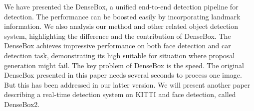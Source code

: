 We have presented the DenseBox, a unified end-to-end detection pipeline for detection. The performance can be boosted easily by incorporating landmark information. We also analysis our method and other related object detection system, highlighting the difference and the contribution of DenseBox.  The DenseBox achieves impressive performance on both face detection and car detection task, demonstrating its high suitable for situation where proposal generation might fail. The key problem of DenseBox is the speed.  The original DenseBox presented in this paper needs several seconds to process one image. But this has been addressed in our latter version.  We will present another paper describing a real-time detection system on KITTI and face detection, called DenseBox2.  



